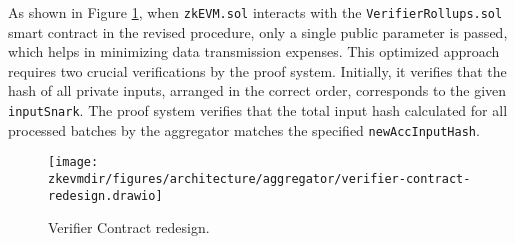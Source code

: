 As shown in Figure \ref{fig:verifier-smart-contract-redesign}, when \texttt{zkEVM.sol} interacts with the \texttt{VerifierRollups.sol} smart contract in the revised procedure, only a single public parameter is passed, which helps in minimizing data transmission expenses. This optimized approach requires two crucial verifications by the proof system. Initially, it verifies that the hash of all private inputs, arranged in the correct order, corresponds to the given \texttt{inputSnark}. The proof system verifies that the total input hash calculated for all processed batches by the aggregator matches the specified \texttt{newAccInputHash}.


\begin{figure}[h]
\centering
\texttt{[image: \\zkevmdir/figures/architecture/aggregator/verifier-contract-redesign.drawio]}
\caption{Verifier Contract redesign.}
\label{fig:verifier-smart-contract-redesign}
\end{figure}
